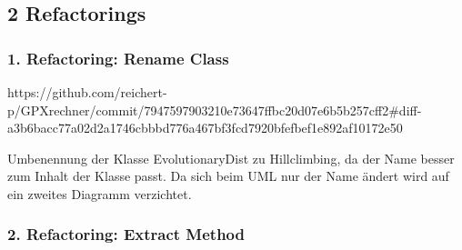 \subsection{2 Refactorings}

\subsubsection{1. Refactoring: Rename Class}

https://github.com/reichert-p/GPXrechner/commit/7947597903210e73647ffbc20d07e6b5b257cff2#diff-a3b6bacc77a02d2a1746cbbbd776a467bf3fcd7920bfefbef1e892af10172e50 

Umbenennung der Klasse EvolutionaryDist zu Hillclimbing, da der Name besser zum Inhalt der Klasse passt. Da sich beim UML nur der Name ändert wird auf ein zweites Diagramm verzichtet.

\subsubsection{2. Refactoring: Extract Method}